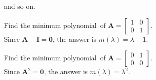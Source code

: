 \documentclass[a4paper,11pt]{article} %
\theoremstyle{plain} %
{\theorembodyfont{\normalfont}
\newtheorem{Exa}{Example}}
\def\mp{minimum polynomial}
\newcommand{\matr}[1]{\mathbf{#1}}
\begin{document}
and so on.

\begin{Exa}
Find the \mp\ of $\matr{A} = \left[ \begin{array}{cc} 1 & 0
\\ 0 & 1 \end{array} \right]$. \\%
\vspace{0.5\baselineskip} %
Since $\matr{A}-\matr{I}=\matr{0}$, the answer is $m(\lambda)=\lambda -1$.
\end{Exa}

\begin{Exa}
Find the \mp\ of $\matr{A} = \left[ \begin{array}{cc} 0 & 1
\\ 0 & 0 \end{array} \right]$. \\%
\vspace{0.5\baselineskip} %
Since $\matr{A}^2=\matr{0}$, the answer is $m(\lambda)={\lambda}^2$.
\end{Exa}
\end{document}

